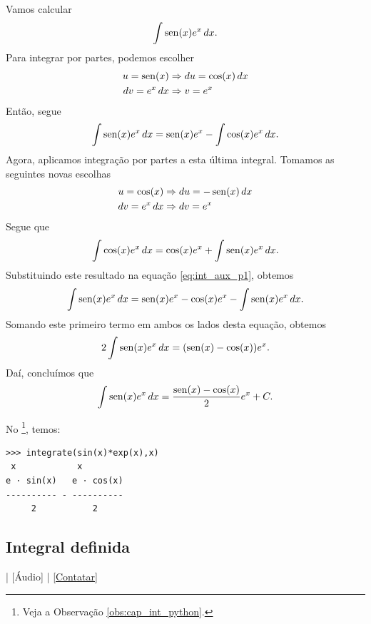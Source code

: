 \begin{ex}
  Vamos calcular
  \begin{equation}
    \int \operatorname{sen}(x)e^x\,dx.
  \end{equation}
  Para integrar por partes, podemos escolher
  \begin{align}
    u = \operatorname{sen}(x) &\Rightarrow du = \cos(x)\,dx \\
    dv = e^x\,dx &\Rightarrow v = e^x
  \end{align}
  Então, segue
  \begin{equation}\label{eq:int_aux_p1}
    \int\operatorname{sen}(x)e^x\,dx = \operatorname{sen}(x)e^x - \int\cos(x)e^x\,dx.
  \end{equation}
  Agora, aplicamos integração por partes a esta última integral. Tomamos as seguintes novas escolhas
  \begin{align}
    u = \cos(x) &\Rightarrow du = -\operatorname{sen}(x)\,dx \\
    dv = e^x\,dx &\Rightarrow dv = e^x
  \end{align}
  Segue que
  \begin{equation}
    \int\cos(x)e^x\,dx = \cos(x)e^x + \int\operatorname{sen}(x)e^x\,dx.
  \end{equation}
  Substituindo este resultado na equação \eqref{eq:int_aux_p1}, obtemos
  \begin{equation}
    \int\operatorname{sen}(x)e^x\,dx = \operatorname{sen}(x)e^x-\cos(x)e^x-\int\operatorname{sen}(x)e^x\,dx.
  \end{equation}
  Somando este primeiro termo em ambos os lados desta equação, obtemos
  \begin{equation}
    2\int\operatorname{sen}(x)e^x\,dx = (\operatorname{sen}(x)-\cos(x))e^x.
  \end{equation}
  Daí, concluímos que
  \begin{equation}
    \int\operatorname{sen}(x)e^x\,dx = \frac{\operatorname{sen}(x)-\cos(x)}{2}e^x + C.
  \end{equation}

  \ifispython
  No \sympy\footnote{Veja a Observação \ref{obs:cap_int_python}.}, temos:
\begin{verbatim}
>>> integrate(sin(x)*exp(x),x)
 x            x
e · sin(x)   e · cos(x)
---------- - ----------
     2           2
\end{verbatim}
  \fi
\end{ex}

\subsection{Integral definida}

\begin{flushright}
  [Vídeo] | [Áudio] | \href{https://phkonzen.github.io/notas/contato.html}{[Contatar]}
\end{flushright}

